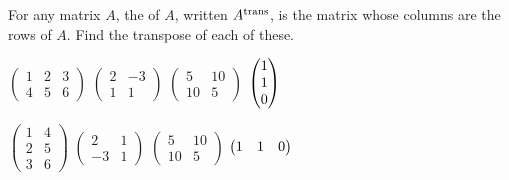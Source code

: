 \begin{exercises}
\begin{answer}
\begin{exparts*}
      \end{exparts*}  
    \end{answer}
  \item  
    For any matrix \( A \), the 
    of \( A \), written
    \( {{A}^{\rm trans}} \), is the matrix whose columns are the rows of \( A \).
    Find the transpose of each of these.
    \begin{exparts*}
      \partsitem \( \begin{pmatrix}
                  1  &2  &3  \\
                  4  &5  &6
               \end{pmatrix}  \)
      \partsitem \( \begin{pmatrix}
                  2  &-3 \\
                  1  &1
               \end{pmatrix}  \)
      \partsitem \( \begin{pmatrix}
                  5  &10 \\
                 10  &5
               \end{pmatrix}  \)
      \partsitem \( \begin{pmatrix} 1 \\ 1 \\ 0 \end{pmatrix} \)
    \end{exparts*}
    \begin{answer}
      \begin{exparts*}
        \partsitem \( \begin{pmatrix}
                   1  &4  \\
                   2  &5  \\
                   3  &6
                 \end{pmatrix}  \)
        \partsitem \( \begin{pmatrix}
                   2  &1  \\
                  -3  &1
                 \end{pmatrix}  \)
        \partsitem \( \begin{pmatrix}
                   5  &10 \\
                  10  &5
                 \end{pmatrix}  \)
        \partsitem \( \begin{pmatrix} 1 &1 &0 \end{pmatrix}  \)
      \end{exparts*}  
     \end{answer}
  \recommended \item 
    \begin{exparts}

\end{exparts}
\end{exercises}
